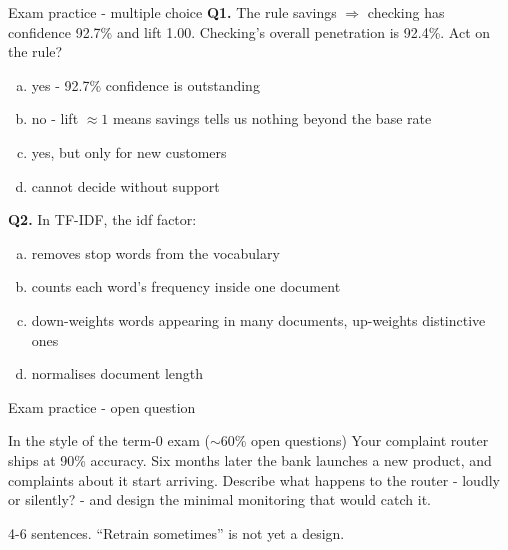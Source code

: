 \documentclass[10pt,aspectratio=169]{beamer}
\begin{document}
\begin{frame}{Exam practice - multiple choice}
  \small
  \textbf{Q1.} The rule savings $\Rightarrow$ checking has confidence 92.7\%
  and lift 1.00. Checking's overall penetration is 92.4\%. Act on the rule?
  \begin{enumerate}[(a)]
    \item yes - 92.7\% confidence is outstanding
    \item no - lift $\approx 1$ means savings tells us nothing beyond the
          base rate
    \item yes, but only for new customers
    \item cannot decide without support
  \end{enumerate}
  \vspace{0.4em}
  \textbf{Q2.} In TF-IDF, the idf factor:
  \begin{enumerate}[(a)]
    \item removes stop words from the vocabulary
    \item counts each word's frequency inside one document
    \item down-weights words appearing in many documents, up-weights
          distinctive ones
    \item normalises document length
  \end{enumerate}
\end{frame}

\begin{frame}{Exam practice - open question}
  \begin{block}{In the style of the term-0 exam ($\sim$60\% open questions)}
    Your complaint router ships at 90\% accuracy. Six months later the bank
    launches a new product, and complaints about it start arriving. Describe
    what happens to the router - loudly or silently? - and design the
    minimal monitoring that would catch it.
  \end{block}
  \vspace{0.5em}
  \begin{center}\small
    4-6 sentences. ``Retrain sometimes'' is not yet a design.
  \end{center}
\end{frame}
\end{document}
